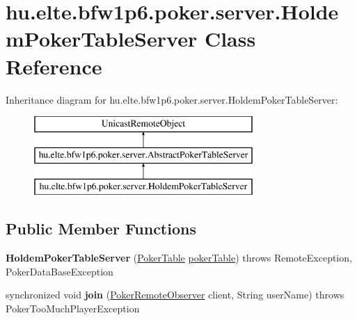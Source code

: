 \hypertarget{classhu_1_1elte_1_1bfw1p6_1_1poker_1_1server_1_1_holdem_poker_table_server}{}\section{hu.\+elte.\+bfw1p6.\+poker.\+server.\+Holdem\+Poker\+Table\+Server Class Reference}
\label{classhu_1_1elte_1_1bfw1p6_1_1poker_1_1server_1_1_holdem_poker_table_server}
Inheritance diagram for hu.\+elte.\+bfw1p6.\+poker.\+server.\+Holdem\+Poker\+Table\+Server\+:\begin{figure}[H]
\begin{center}
\leavevmode
\includegraphics[height=3.000000cm]{classhu_1_1elte_1_1bfw1p6_1_1poker_1_1server_1_1_holdem_poker_table_server}
\end{center}
\end{figure}
\subsection*{Public Member Functions}
\begin{DoxyCompactItemize}
\item 
\hypertarget{classhu_1_1elte_1_1bfw1p6_1_1poker_1_1server_1_1_holdem_poker_table_server_afb089abea4a0981ee503fc5dce7c465e}{}{\bfseries Holdem\+Poker\+Table\+Server} (\hyperlink{classhu_1_1elte_1_1bfw1p6_1_1poker_1_1model_1_1entity_1_1_poker_table}{Poker\+Table} \hyperlink{classhu_1_1elte_1_1bfw1p6_1_1poker_1_1server_1_1_abstract_poker_table_server_ac8a64a77bcae91e7824b32911ce76ed4}{poker\+Table})  throws Remote\+Exception, Poker\+Data\+Base\+Exception \label{classhu_1_1elte_1_1bfw1p6_1_1poker_1_1server_1_1_holdem_poker_table_server_afb089abea4a0981ee503fc5dce7c465e}

\item 
\hypertarget{classhu_1_1elte_1_1bfw1p6_1_1poker_1_1server_1_1_holdem_poker_table_server_a6ccd1d29633368993dfe0e52e6317d16}{}synchronized void {\bfseries join} (\hyperlink{interfacehu_1_1elte_1_1bfw1p6_1_1poker_1_1client_1_1observer_1_1_poker_remote_observer}{Poker\+Remote\+Observer} client, String user\+Name)  throws Poker\+Too\+Much\+Player\+Exception \label{classhu_1_1elte_1_1bfw1p6_1_1poker_1_1server_1_1_holdem_poker_table_server_a6ccd1d29633368993dfe0e52e6317d16}

\end{DoxyCompactItemize}
